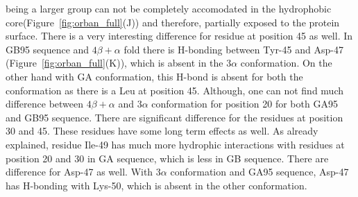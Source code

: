 \documentclass[12pt]{article}
\begin{document}
being a larger group can not be completely accomodated in the hydrophobic core(Figure~\ref{fig:orban_full}(J)) and therefore, 
partially exposed to the protein surface. There is a very interesting difference for residue at position 45 as well. In GB95 sequence
and $4 \beta + \alpha$ fold there is H-bonding between Tyr-45 and Asp-47 (Figure~\ref{fig:orban_full}(K)), which is absent in the
$3 \alpha$ conformation. On the other hand with GA conformation, this H-bond is absent for both the conformation as there is a Leu at position
45. Although, one can not find much difference between $4 \beta + \alpha$ and $3 \alpha$ conformation
for position 20 for both GA95 and GB95 sequence. There are significant difference for the residues at position 30 and 45.  
These residues have some long term effects as well. As already explained, residue Ile-49 has much more hydrophic interactions with residues
at position 20 and 30 in GA sequence, which is less in GB sequence. There are difference for Asp-47 as well. With $3 \alpha$ conformation 
and GA95 sequence, Asp-47 has H-bonding with Lys-50, which is absent in the other conformation.    
      
\end{document}
